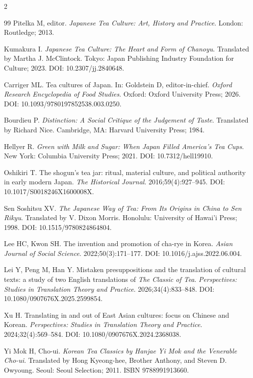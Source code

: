 \documentclass[numbers]{IntechOpen-Book}
\begin{document}
\begin{backmatter}
\begin{multicols}{2}
\begin{thebibliography}{99}
 Pitelka M, editor. \textit{Japanese Tea Culture: Art, History and Practice}. London: Routledge; 2013.

 Kumakura I. \textit{Japanese Tea Culture: The Heart and Form of Chanoyu}. Translated by Martha J. McClintock. Tokyo: Japan Publishing Industry Foundation for Culture; 2023. DOI: 10.2307/jj.2840648.

 Carriger ML. Tea cultures of Japan. In: Goldstein D, editor-in-chief. \textit{Oxford Research Encyclopedia of Food Studies}. Oxford: Oxford University Press; 2026. DOI: 10.1093/9780197852538.003.0250.

 Bourdieu P. \textit{Distinction: A Social Critique of the Judgement of Taste}. Translated by Richard Nice. Cambridge, MA: Harvard University Press; 1984.

 Hellyer R. \textit{Green with Milk and Sugar: When Japan Filled America's Tea Cups}. New York: Columbia University Press; 2021. DOI: 10.7312/hell19910.

 Oshikiri T. The shogun's tea jar: ritual, material culture, and political authority in early modern Japan. \textit{The Historical Journal}. 2016;59(4):927--945. DOI: 10.1017/S0018246X1600008X.

 Sen Soshitsu XV. \textit{The Japanese Way of Tea: From Its Origins in China to Sen Rikyu}. Translated by V. Dixon Morris. Honolulu: University of Hawai'i Press; 1998. DOI: 10.1515/9780824864804.

 Lee HC, Kwon SH. The invention and promotion of cha-rye in Korea. \textit{Asian Journal of Social Science}. 2022;50(3):171--177. DOI: 10.1016/j.ajss.2022.06.004.

 Lei Y, Peng M, Han Y. Mistaken presuppositions and the translation of cultural texts: a study of two English translations of \textit{The Classic of Tea}. \textit{Perspectives: Studies in Translation Theory and Practice}. 2026;34(4):833--848. DOI: 10.1080/0907676X.2025.2599854.

 Xu H. Translating in and out of East Asian cultures: focus on Chinese and Korean. \textit{Perspectives: Studies in Translation Theory and Practice}. 2024;32(4):569--584. DOI: 10.1080/0907676X.2024.2368038.

 Yi Mok H, Cho-ui. \textit{Korean Tea Classics by Hanjae Yi Mok and the Venerable Cho-ui}. Translated by Hong Kyeong-hee, Brother Anthony, and Steven D. Owyoung. Seoul: Seoul Selection; 2011. ISBN 9788991913660.


\end{thebibliography}
\end{multicols}
\end{backmatter}
\end{document}
